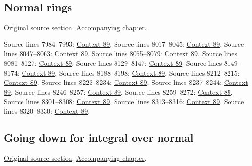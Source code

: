 \subsection{Normal rings}
\hypertarget{algebra-source-section-normal-rings}{}
\noindent\href{https://github.com/stacks/stacks-project/blob/a04446e57ec1fbc252a871afcec7752fb2807b14/algebra.tex\#L7971}{Original source section}. \href{algebra.pdf\#nameddest=section-normal-rings}{Accompanying chapter}.

\begin{AlgebraSourceRoutes}
 Source lines 7984--7993: \hyperlink{algebra-context-089}{Context 89}.
 Source lines 8017--8045: \hyperlink{algebra-context-089}{Context 89}.
 Source lines 8047--8063: \hyperlink{algebra-context-089}{Context 89}.
 Source lines 8065--8079: \hyperlink{algebra-context-089}{Context 89}.
 Source lines 8081--8127: \hyperlink{algebra-context-089}{Context 89}.
 Source lines 8129--8147: \hyperlink{algebra-context-089}{Context 89}.
 Source lines 8149--8174: \hyperlink{algebra-context-089}{Context 89}.
 Source lines 8188--8198: \hyperlink{algebra-context-089}{Context 89}.
 Source lines 8212--8215: \hyperlink{algebra-context-089}{Context 89}.
 Source lines 8223--8234: \hyperlink{algebra-context-089}{Context 89}.
 Source lines 8237--8244: \hyperlink{algebra-context-089}{Context 89}.
 Source lines 8246--8257: \hyperlink{algebra-context-089}{Context 89}.
 Source lines 8259--8272: \hyperlink{algebra-context-089}{Context 89}.
 Source lines 8301--8308: \hyperlink{algebra-context-089}{Context 89}.
 Source lines 8313--8316: \hyperlink{algebra-context-089}{Context 89}.
 Source lines 8320--8330: \hyperlink{algebra-context-089}{Context 89}.
\end{AlgebraSourceRoutes}

\subsection{Going down for integral over normal}
\hypertarget{algebra-source-section-going-down-integral-over-normal}{}
\noindent\href{https://github.com/stacks/stacks-project/blob/a04446e57ec1fbc252a871afcec7752fb2807b14/algebra.tex\#L8339}{Original source section}. \href{algebra.pdf\#nameddest=section-going-down-integral-over-normal}{Accompanying chapter}.

